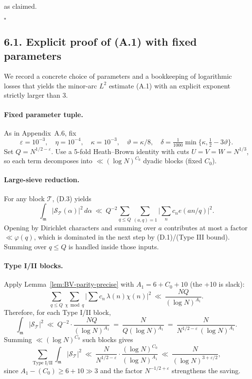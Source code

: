 \documentclass[11pt]{article}
\theoremstyle{definition}
\theoremstyle{remark}
\begin{document}
as claimed.

$\square$

\subsection*{6.1. Explicit proof of (A.1) with fixed parameters}

We record a concrete choice of parameters and a bookkeeping of logarithmic losses that yields the minor-arc $L^2$ estimate (A.1) with an explicit exponent strictly larger than $3$.

\paragraph{Fixed parameter tuple.} As in Appendix~A.6, fix
\[
	\varepsilon=10^{-3},\quad \eta=10^{-4},\quad \kappa=10^{-3},\quad \vartheta=\kappa/8,\quad \delta=\tfrac{1}{1000}\min\{\kappa,\tfrac12-3\vartheta\}.
\]
Set $Q=N^{1/2-\varepsilon}$. Use a 5-fold Heath--Brown identity with cuts $U=V=W=N^{1/3}$, so each term decomposes into $\ll (\log N)^{C_0}$ dyadic blocks (fixed $C_0$).

\paragraph{Large-sieve reduction.} For any block $\mathcal T$, (D.3) yields
\[
	\int_{\mathfrak m}|\mathcal S_{\mathcal T}(\alpha)|^2\,d\alpha\ \ll\ Q^{-2}\sum_{q\le Q}\sum_{(a,q)=1}\Big|\sum_n c_n e(an/q)\Big|^2.
\]
Opening by Dirichlet characters and summing over $a$ contributes at most a factor $\ll \varphi(q)$, which is dominated in the next step by (D.1)/(Type III bound). Summing over $q\le Q$ is handled inside those inputs.

\paragraph{Type I/II blocks.} Apply Lemma~\ref{lem:BV-parity-precise} with $A_1=6+C_0+10$ (the +10 is slack):
\[
	\sum_{q\le Q}\sum_{\chi\bmod q}\Big|\sum c_n\,\lambda(n)\chi(n)\Big|^2\ \ll\ \frac{NQ}{(\log N)^{A_1}}.
\]
Therefore, for each Type I/II block,
\[
	\int_{\mathfrak m}|\mathcal S_{\mathcal T}|^2\ \ll\ Q^{-2}\cdot \frac{NQ}{(\log N)^{A_1}}\ =\ \frac{N}{Q(\log N)^{A_1}}\ =\ \frac{N}{N^{1/2-\varepsilon}\,(\log N)^{A_1}}.
\]
Summing $\ll (\log N)^{C_0}$ such blocks gives
\[
	\sum_{\text{Type I/II}}\int_{\mathfrak m}|\mathcal S_{\mathcal T}|^2\ \ll\ \frac{N}{N^{1/2-\varepsilon}}\cdot \frac{(\log N)^{C_0}}{(\log N)^{A_1}}\ \ll\ \frac{N}{(\log N)^{3+\varepsilon/2}},
\]
since $A_1-(C_0)\ge 6+10\gg 3$ and the factor $N^{-1/2+\varepsilon}$ strengthens the saving.
\end{document}
